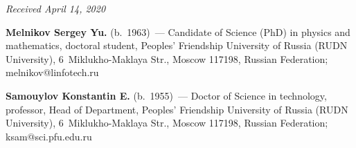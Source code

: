 \vspace*{-9pt}

\hfill{\small\textit{Received April 14, 2020}}




\Contr

\noindent
\textbf{Melnikov Sergey Yu.} (b.\ 1963)~--- Candidate of Science (PhD) in physics 
and mathematics, doctoral student, Peoples' Friendship University of Russia (RUDN 
University), 6~Miklukho-Maklaya Str., Moscow 117198, Russian Federation; 
\mbox{melnikov@linfotech.ru}

\vspace*{3pt}

\noindent
\textbf{Samouylov Konstantin E.} (b.\ 1955)~--- Doctor of Science in technology, 
professor, Head of Department, Peoples' Friendship University of Russia (RUDN 
University), 6~Miklukho-Maklaya Str., Moscow 117198, Russian Federation; 
\mbox{ksam@sci.pfu.edu.ru}


\label{end\stat}

\renewcommand{\bibname}{\protect\rm Литература} 